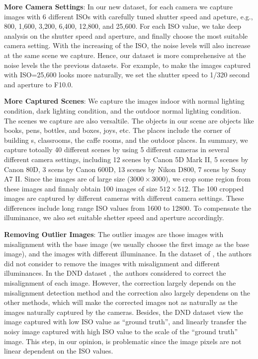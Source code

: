 \textbf{More Camera Settings}: In our new dataset, for each camera we capture images with 6 different ISOs with carefully tuned shutter speed and apeture, e.g., 800, 1,600, 3,200, 6,400, 12,800, and 25,600. For each ISO value, we take deep analysis on the shutter speed and aperture, and finally choose the most suitable camera setting. With the increasing of the ISO, the noise levels will also increase at the same scene we capture. Hence, our dataset is more comprehensive at the noise levels the the previous datasets. For example, to make the images captured with ISO=25,600 looks more naturally, we set the shutter speed to 1/320 second and aperture to F10.0. 

\textbf{More Captured Scenes}: We capture the images indoor with normal lighting condition, dark lighting condition, and the outdoor normal lighting condition. The scenes we capture are also versaltile. The objects in our scene are objects like books, pens, bottles, and boxes, joys, etc. The places include the corner of building s, classrooms, the caffe rooms, and the outdoor places. In summary, we capture totoally 40 different scenes by using 5 different cameras in several different camera settings, including 12 scenes by Canon 5D Mark II, 5 scenes by Canon 80D, 3 scens by Canon 600D, 13 scenes by Nikon D800, 7 scens by Sony A7 II. Since the images are of large size ($3000\times3000$), we crop some region from these images and finnaly obtain 100 images of size $512\times512$. The 100 cropped images are captured by different cameras with different camera settings. These differences include long range ISO values from 1600 to 12800. To compensate the illuminance, we also set suitable shetter speed and aperture accordingly. 

\textbf{Removing Outlier Images}: The outlier images are those images with misalignment with the base image (we usually choose the first image as the base image), and the images with different illuminance. In the dataset of \cite{crosschannel2016}, the authors did not consider to remove the images with misalignment and different illuminances. In the DND dataset \cite{dnd2017}, the authors considered to correct the misalignment of each image. However, the correction largely depends on the misalignment detection method and the correction also largely dependens on the other methods, which will make the corrected images not as naturally as the images naturally captured by the cameras. Besides, the DND dataset \cite{dnd2017} view the image captured with low ISO value as ``ground truth'', and linearly transfer the noisy image captured with high ISO value to the scale of the ``ground truth'' image. This step, in our opinion, is problematic since the image pixels are not linear dependent on the ISO values. 
 
